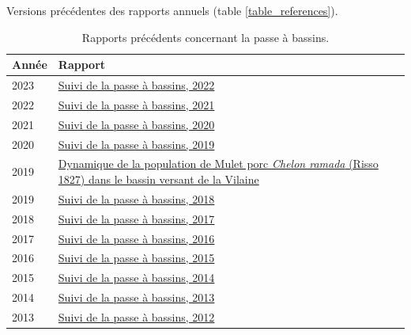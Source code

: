 \documentclass[11pt,twocolumn,titlepage,twoside]{article}\usepackage[]{graphicx}\usepackage[]{color}
\begin{document}
\clearpage
Versions précédentes des rapports annuels (table \ref{table_references}).


\begin{table}[htbp]
\centering
\caption{Rapports précédents concernant la passe à bassins.}
\begin{tabular}{lp{7cm}}
\toprule
Année & Rapport \\
\midrule
2023 &
\href{TODO}{Suivi
de la passe à bassins, 2022} \\
2022 &
\href{TODO}{Suivi
de la passe à bassins, 2021} \\
2021 &
\href{https://eptbvilaine56.sharepoint.com/:b:/g/extranet/EX0SnyoGmBlMsO-6-Il8wugBCHYxha3l2A-5tA9yTCqwbg?e=XukC2d}{Suivi
de la passe à bassins, 2020} \\
2020 &
\href{https://eptbvilaine56.sharepoint.com/:b:/g/extranet/EQl4smhm635FgMPzE9bFyxsB_9ZMmVLH34BJLfwieJKuUA?e=dtqKYE}{Suivi
de la passe à bassins, 2019} \\
2019 &
\href{https://eptbvilaine56.sharepoint.com/:b:/g/extranet/ESlFdwgrzNZPjHy2CamDrh4Bd-wJB1BhJ-Hf19RuTZlpgw?e=3pPkHa}{Dynamique de la population de Mulet porc \textit{Chelon ramada} (Risso 1827) dans le bassin versant de la Vilaine}\\
2019 & 
\href{https://eptbvilaine56.sharepoint.com/:b:/g/extranet/EfsNAFGO4sRAoEb-9-SEERoBJAxYBJVWvF-9OVVryuF8QA?e=G5x6Ij}{Suivi
de la passe à bassins, 2018}\\
2018 &
\href{https://eptbvilaine56.sharepoint.com/:b:/g/extranet/EddDt8hE-z5KvA3qWm8RiUYBiawsguFwtT101pmeEXjEiQ?e=TdLuRC}{Suivi
de la passe à bassins, 2017}\\
2017 &
\href{https://eptbvilaine56.sharepoint.com/:b:/g/extranet/EZovsRks3WFKsse_rsnnqh0BAcwjBH5ofFK1pjdwtAe6Dw?e=sRP0k9}{Suivi
de la passe à bassins, 2016}\\
2016 &
\href{https://eptbvilaine56.sharepoint.com/:b:/g/extranet/EUaIB9CdQItLkPTR0banFZYBv7DnfD7uNSezUSFVD9tfcw?e=ZAWC9t}{Suivi
de la passe à bassins, 2015}\\
2015 &
\href{https://eptbvilaine56.sharepoint.com/:b:/g/extranet/EQCdJUAzgLlJpqe-HgXcbn4BvTlV7Xool5zCmmV-fZaolg?e=dvEObL}{Suivi
de la passe à bassins, 2014}\\
2014 &
\href{https://eptbvilaine56.sharepoint.com/:b:/g/extranet/Effnw5jtEPFHmxCcqlWiTBsB0Cm29yADN5bSREbOi1yTzA?e=YS1Ref}{Suivi
de la passe à bassins, 2013}\\
2013 &
\href{https://eptbvilaine56.sharepoint.com/:b:/g/extranet/Ed6J-KFKTc1EhcXyxox1eU4B86i9IYhY53FuP2ilW9TdhA?e=pagXSD}{Suivi
de la passe à bassins, 2012}\\

\end{tabular}
\end{table}
\end{document}
